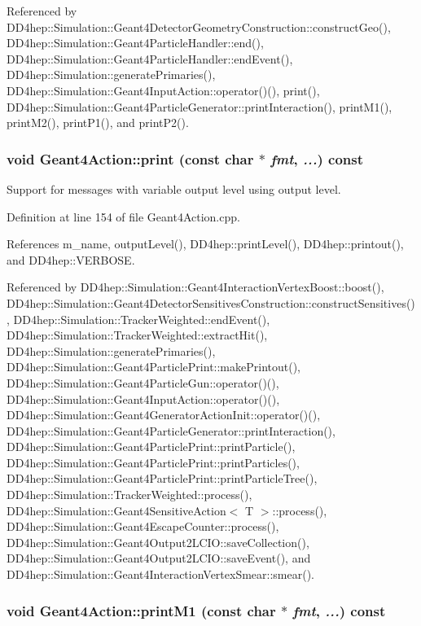 Referenced by DD4hep::Simulation::Geant4DetectorGeometryConstruction::constructGeo(), DD4hep::Simulation::Geant4ParticleHandler::end(), DD4hep::Simulation::Geant4ParticleHandler::endEvent(), DD4hep::Simulation::generatePrimaries(), DD4hep::Simulation::Geant4InputAction::operator()(), print(), DD4hep::Simulation::Geant4ParticleGenerator::printInteraction(), printM1(), printM2(), printP1(), and printP2().\hypertarget{class_d_d4hep_1_1_simulation_1_1_geant4_action_abff9f8350b90ba55ee98041b0c6291ae}{
\subsubsection[{print}]{\setlength{\rightskip}{0pt plus 5cm}void Geant4Action::print (const char $\ast$ {\em fmt}, \/   {\em ...}) const}}
\label{class_d_d4hep_1_1_simulation_1_1_geant4_action_abff9f8350b90ba55ee98041b0c6291ae}


Support for messages with variable output level using output level. 

Definition at line 154 of file Geant4Action.cpp.

References m\_\-name, outputLevel(), DD4hep::printLevel(), DD4hep::printout(), and DD4hep::VERBOSE.

Referenced by DD4hep::Simulation::Geant4InteractionVertexBoost::boost(), DD4hep::Simulation::Geant4DetectorSensitivesConstruction::constructSensitives(), DD4hep::Simulation::TrackerWeighted::endEvent(), DD4hep::Simulation::TrackerWeighted::extractHit(), DD4hep::Simulation::generatePrimaries(), DD4hep::Simulation::Geant4ParticlePrint::makePrintout(), DD4hep::Simulation::Geant4ParticleGun::operator()(), DD4hep::Simulation::Geant4InputAction::operator()(), DD4hep::Simulation::Geant4GeneratorActionInit::operator()(), DD4hep::Simulation::Geant4ParticleGenerator::printInteraction(), DD4hep::Simulation::Geant4ParticlePrint::printParticle(), DD4hep::Simulation::Geant4ParticlePrint::printParticles(), DD4hep::Simulation::Geant4ParticlePrint::printParticleTree(), DD4hep::Simulation::TrackerWeighted::process(), DD4hep::Simulation::Geant4SensitiveAction$<$ T $>$::process(), DD4hep::Simulation::Geant4EscapeCounter::process(), DD4hep::Simulation::Geant4Output2LCIO::saveCollection(), DD4hep::Simulation::Geant4Output2LCIO::saveEvent(), and DD4hep::Simulation::Geant4InteractionVertexSmear::smear().\hypertarget{class_d_d4hep_1_1_simulation_1_1_geant4_action_a902ac87d9764b8fdb6abba259482713b}{
\subsubsection[{printM1}]{\setlength{\rightskip}{0pt plus 5cm}void Geant4Action::printM1 (const char $\ast$ {\em fmt}, \/   {\em ...}) const}}
\label{class_d_d4hep_1_1_simulation_1_1_geant4_action_a902ac87d9764b8fdb6abba259482713b}


